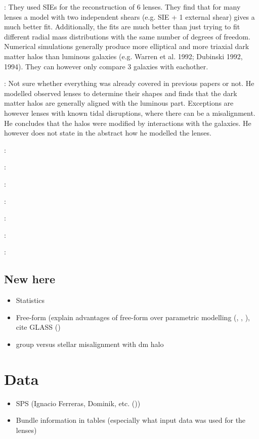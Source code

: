 \documentclass[10pt]{article}
\begin{document}
\textbf{\cite{1998ApJ...509..561K}}: They used SIEs for the reconstruction of 6 lenses. They find that for many lenses a model with two independent shears (e.g. SIE + 1 external shear) gives a much better fit. Additionally, the fits are much better than just trying to fit different radial mass distributions with the same number of degrees of freedom. Numerical simulations generally produce more elliptical and more triaxial dark matter halos than luminous galaxies (e.g. Warren et al. 1992; Dubinski 1992, 1994). They can however only compare 3 galaxies with eachother.

\textbf{\cite{1998PhDT.........6K}}: Not sure whether everything was already covered in previous papers or not. He modelled observed lenses to determine their shapes and finds that the dark matter halos are generally aligned with the luminous part. Exceptions are however lenses with known tidal disruptions, where there can be a misalignment. He concludes that the halos were modified by interactions with the galaxies. He however does not state in the abstract how he modelled the lenses.

\textbf{\cite{2000ApJ...538L.113N}}:

\textbf{\cite{2002sgdh.conf...62K}}:

\textbf{\cite{2005MNRAS.360.1333W}}:

\textbf{\cite{2008MNRAS.383..857F}}:

\textbf{\cite{2011AstRv...6f..43B}}:

\textbf{\cite{2012ApJ...761..170G}}:

\textbf{\cite{2000ApJ...536..584L}}:


\subsection{New here}
\begin{itemize}
\item Statistics
\item Free-form (explain advantages of free-form over parametric modelling (\cite{2004AJ....127.2604S}, \cite{2012MNRAS.425.3077L}, \cite{2008ApJ...681..814C}), cite GLASS (\cite{2012MNRAS.425.3077L})
\item group versus stellar misalignment with dm halo
\end{itemize}



\section{Data}
\begin{itemize}
\item SPS (Ignacio Ferreras, Dominik, etc. (\cite{2011ApJ...740...97L}))
\item Bundle information in tables (especially what input data was used for the lenses)
\end{itemize}
\end{document}

